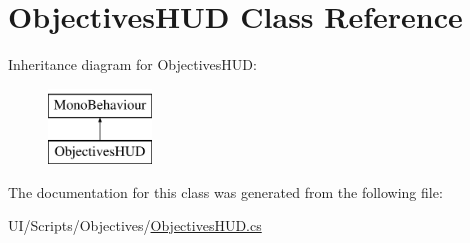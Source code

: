 \hypertarget{class_objectives_h_u_d}{}\section{Objectives\+H\+UD Class Reference}
\label{class_objectives_h_u_d}
Inheritance diagram for Objectives\+H\+UD\+:\begin{figure}[H]
\begin{center}
\leavevmode
\includegraphics[height=2.000000cm]{class_objectives_h_u_d}
\end{center}
\end{figure}


The documentation for this class was generated from the following file\+:\begin{DoxyCompactItemize}
\item 
U\+I/\+Scripts/\+Objectives/\mbox{\hyperlink{_objectives_h_u_d_8cs}{Objectives\+H\+U\+D.\+cs}}\end{DoxyCompactItemize}
